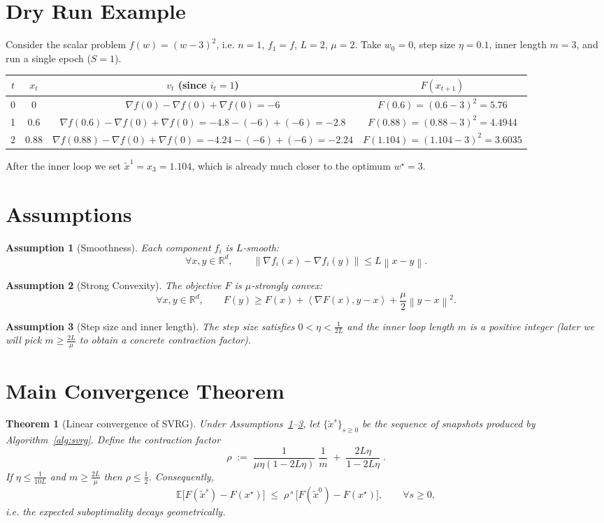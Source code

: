 \documentclass{article}
\newtheorem{theorem}{Theorem}
\newtheorem{assumption}{Assumption}
\newcommand{\E}{\mathbb{E}}
\newcommand{\R}{\mathbb{R}}
\newcommand{\norm}[1]{\left\|#1\right\|}
\newcommand{\inner}[2]{\left\langle #1,#2 \right\rangle}
\begin{document}
\section*{Dry Run Example}
Consider the scalar problem $f(w)=(w-3)^{2}$, i.e. $n=1$, $f_{1}=f$, $L=2$, $\mu=2$.  
Take $w_{0}=0$, step size $\eta=0.1$, inner length $m=3$, and run a single epoch ($S=1$).

\begin{center}
\begin{tabular}{c|c|c|c}
$t$ & $x_t$ & $v_t$ (since $i_t=1$) & $F(x_{t+1})$ \\ \hline
0 & $0$ & $\nabla f(0)-\nabla f(0)+\nabla f(0)= -6$ & $F(0.6)= (0.6-3)^2=5.76$\\
1 & $0.6$ & $\nabla f(0.6)-\nabla f(0)+\nabla f(0)= -4.8-(-6)+(-6)= -2.8$ & $F(0.88)= (0.88-3)^2=4.4944$\\
2 & $0.88$ & $\nabla f(0.88)-\nabla f(0)+\nabla f(0)= -4.24-(-6)+(-6)= -2.24$ & $F(1.104)= (1.104-3)^2=3.6035$
\end{tabular}
\end{center}
After the inner loop we set $\tilde{x}^{1}=x_{3}=1.104$, which is already much closer to the optimum $w^{\star}=3$.

\section*{Assumptions}
\begin{assumption}[Smoothness]\label{ass:smooth}
Each component $f_i$ is $L$‑smooth:
\[
\forall x,y\in\R^{d},\qquad 
\norm{\nabla f_i(x)-\nabla f_i(y)}\le L\norm{x-y}.
\]
\end{assumption}
\begin{assumption}[Strong Convexity]\label{ass:strong}
The objective $F$ is $\mu$‑strongly convex:
\[
\forall x,y\in\R^{d},\qquad 
F(y)\ge F(x)+\inner{\nabla F(x)}{y-x}+\frac{\mu}{2}\norm{y-x}^{2}.
\]
\end{assumption}
\begin{assumption}[Step size and inner length]\label{ass:hyper}
The step size satisfies $0<\eta<\frac{1}{2L}$ and the inner loop length $m$ is a positive integer (later we will pick $m\ge \frac{2L}{\mu}$ to obtain a concrete contraction factor).
\end{assumption}

\section*{Main Convergence Theorem}
\begin{theorem}[Linear convergence of SVRG]\label{thm:linear}
Under Assumptions~\ref{ass:smooth}–\ref{ass:hyper}, let $\{\tilde{x}^{s}\}_{s\ge0}$ be the sequence of snapshots produced by Algorithm~\ref{alg:svrg}. Define the contraction factor
\[
\rho \;:=\; \frac{1}{\mu\eta(1-2L\eta)}\;\frac{1}{m} \;+\; \frac{2L\eta}{1-2L\eta}\; .
\]
If $\eta\le \frac{1}{10L}$ and $m\ge \frac{2L}{\mu}$ then $\rho\le \frac12$. Consequently,
\[
\E\!\bigl[F(\tilde{x}^{s})-F(x^{\star})\bigr]\;\le\;\rho^{\,s}\,\bigl[F(\tilde{x}^{0})-F(x^{\star})\bigr],
\qquad\forall s\ge0,
\]
i.e. the expected suboptimality decays \emph{geometrically}.
\end{theorem}
\end{document}
